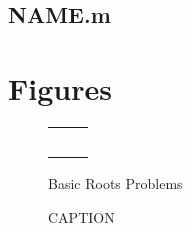 \documentclass{article}
\begin{document}

\subsection{NAME.m}


\pagebreak


\section{Figures}
\begin{figure}[htb!]
\begin{center}
\begin{tabular}{cc}
~
\end{tabular}
\caption{Basic Roots Problems}
\end{center}
\end{figure}


\begin{figure}[htb!]
\begin{center}
\caption{CAPTION}
\end{center}
\end{figure}
\end{document}
